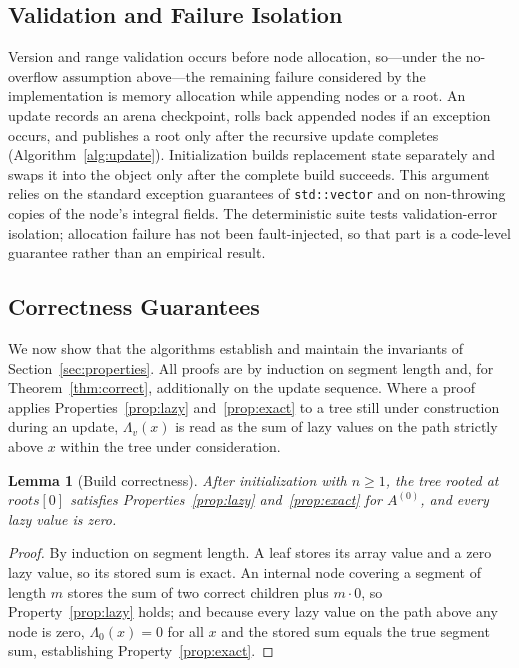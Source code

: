 \documentclass[conference]{IEEEtran}
\newtheorem{lemma}{Lemma}
\begin{document}
\subsection{Validation and Failure Isolation}
\label{sec:failure}

Version and range validation occurs before node allocation, so---under the no-overflow assumption
above---the remaining failure considered by the implementation is memory allocation while
appending nodes or a root. An update records an arena checkpoint, rolls back appended nodes if an
exception occurs, and publishes a root only after the recursive update completes
(Algorithm~\ref{alg:update}). Initialization builds replacement state separately and swaps it into
the object only after the complete build succeeds. This argument relies on the standard
exception guarantees of \texttt{std::vector} and on non-throwing copies of the node's integral
fields. The deterministic suite tests validation-error isolation; allocation failure has not been
fault-injected, so that part is a code-level guarantee rather than an empirical result.

\subsection{Correctness Guarantees}
\label{sec:proofs}

We now show that the algorithms establish and maintain the invariants of
Section~\ref{sec:properties}. All proofs are by induction on segment length and, for
Theorem~\ref{thm:correct}, additionally on the update sequence. Where a proof applies
Properties~\ref{prop:lazy} and~\ref{prop:exact} to a tree still under construction during an
update, $\Lambda_v(x)$ is read as the sum of lazy values on the path strictly above $x$ within
the tree under consideration.

\begin{lemma}[Build correctness]
\label{lem:build}
After initialization with $n \geq 1$, the tree rooted at $\textit{roots}[0]$ satisfies
Properties~\ref{prop:lazy} and~\ref{prop:exact} for $A^{(0)}$, and every lazy value is zero.
\end{lemma}

\begin{proof}
By induction on segment length. A leaf stores its array value and a zero lazy value, so its
stored sum is exact. An internal node covering a segment of length $m$ stores the sum of two
correct children plus $m \cdot 0$, so Property~\ref{prop:lazy} holds; and because every lazy
value on the path above any node is zero, $\Lambda_0(x) = 0$ for all $x$ and the stored sum
equals the true segment sum, establishing Property~\ref{prop:exact}.
\end{proof}
\end{document}
